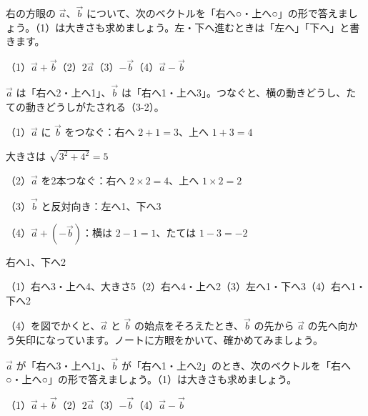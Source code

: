 \begin{reidai}[方眼の上の実数倍・和・差]
\noindent\begin{minipage}[c]{0.6\linewidth}\raggedright 
右の方眼の $\vec{a}$、$\vec{b}$ について、次のベクトルを「右へ○・上へ○」の形で答えましょう。（1）は大きさも求めましょう。左・下へ進むときは「左へ」「下へ」と書きます。\par
（1）$\vec{a}+\vec{b}$\quad（2）$2\vec{a}$\quad（3）$-\vec{b}$\quad（4）$\vec{a}-\vec{b}$
\end{minipage}\hfill
\begin{minipage}[c]{0.36\linewidth}\centering
{}
\end{minipage}\par\vspace{2pt}
\kangaekata $\vec{a}$ は「右へ2・上へ1」、$\vec{b}$ は「右へ1・上へ3」。つなぐと、横の動きどうし、たての動きどうしがたされる（3-2）。\par
\shiki（1）$\vec{a}$ に $\vec{b}$ をつなぐ：右へ $2+1=3$、上へ $1+3=4$\par
\hspace*{4.6\zw}大きさは $\sqrt{3^2+4^2}=5$\par
\hspace*{2.6\zw}（2）$\vec{a}$ を2本つなぐ：右へ $2\times2=4$、上へ $1\times2=2$\par
\hspace*{2.6\zw}（3）$\vec{b}$ と反対向き：左へ1、下へ3\par
\hspace*{2.6\zw}（4）$\vec{a}+(-\vec{b})$：横は $2-1=1$、たては $1-3=-2$\par
\hspace*{4.6\zw}右へ1、下へ2\par
\kotae （1）右へ3・上へ4、大きさ5\quad（2）右へ4・上へ2\quad（3）左へ1・下へ3\quad（4）右へ1・下へ2
\end{reidai}
（4）を図でかくと、$\vec{a}$ と $\vec{b}$ の始点をそろえたとき、$\vec{b}$ の先から $\vec{a}$ の先へ向かう矢印になっています。ノートに方眼をかいて、確かめてみましょう。

\begin{jibun}
$\vec{a}$ が「右へ3・上へ1」、$\vec{b}$ が「右へ1・上へ2」のとき、次のベクトルを「右へ○・上へ○」の形で答えましょう。（1）は大きさも求めましょう。\par
（1）$\vec{a}+\vec{b}$\quad（2）$2\vec{a}$\quad（3）$-\vec{b}$\quad（4）$\vec{a}-\vec{b}$
\end{jibun}

